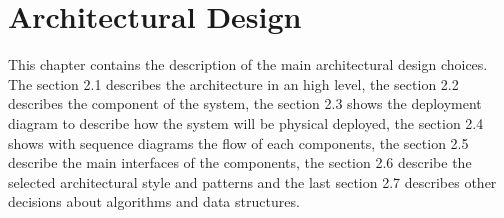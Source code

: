 \chapter{Architectural Design}


This chapter contains the description of the main architectural design choices. The section 2.1 describes the architecture in an high level, the section 2.2 describes the component of the system, the section 2.3 shows the deployment diagram to describe how the system will be physical deployed, the section 2.4 shows with sequence diagrams the flow of each components, the section 2.5 describe the main interfaces of the components, the section 2.6 describe the selected architectural style and patterns and the last section 2.7 describes other decisions about algorithms and data structures.










